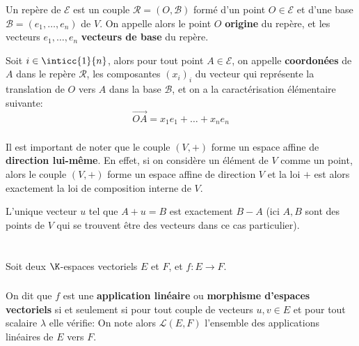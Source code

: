\subsection*{}
Un repère de \(\mathscr{E}\) est un couple \(\mathscr{R} = (O, \mathscr{B})\) formé d'un point \(O \in \mathscr{E}\) et d'une base \(\mathscr{B} = (e_1, \ldots, e_n)\) de \(V\). On appelle alors le point \(O\) \textbf{origine} du repère, et les vecteurs \(e_1, \ldots, e_n\) \textbf{vecteurs de base} du repère.\<

Soit \(i\in\inticc{1}{n}\), alors pour tout point \(A \in \mathscr{E}\), on appelle \textbf{coordonées} de \(A\) dans le repère \(\mathscr{R}\), les composantes \((x_i)_i\) du vecteur qui représente la translation de \(O\) vers \(A\) dans la base \(\mathscr{B}\), et on a la caractérisation élémentaire suivante:
\[
   \overrightarrow{OA} = x_1e_1 + \ldots + x_ne_n 
\]

\subsection*{}
Il est important de noter que le couple \((V, +)\) forme un espace affine de \textbf{direction lui-même}. En effet, si on considère un élément de \(V\) comme un point, alors le couple  \((V, +)\) forme un espace affine de direction \(V\) et la loi \(+\) est alors exactement la loi de composition interne de \(V\).\<

L'unique vecteur \(u\) tel que \(A + u = B\) est exactement \(B - A\) (ici \(A, B\) sont des points de \(V\) qui se trouvent être des vecteurs dans ce cas particulier).

\chapter*{} %

Soit deux \(\K\)-espaces vectoriels \(E\) et \(F\), et \(f : E \longrightarrow F \).

\subsection*{}

On dit que \(f\) est une \textbf{application linéaire} ou \textbf{morphisme d'espaces vectoriels} si et seulement si pour tout couple de vecteurs \(u, v \in E\) et pour tout scalaire \(\lambda\) elle vérifie: 
On note alors \(\mathcal{L}(E, F)\) l'ensemble des applications linéaires de \(E\) vers \(F\).\<

